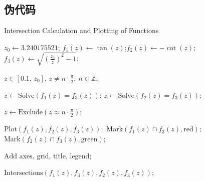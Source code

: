 \subsection{伪代码}

\begin{algorithm}[H]
    \caption{Intersection Calculation and Plotting of Functions}
    \label{alg:intersection_calculation}

    $z_0 \gets 3.240175521$;
    $f_1(z) \gets \tan(z)$;\quad $f_2(z) \gets -\cot(z)$;\quad $f_3(z) \gets \sqrt{\left( \frac{z_0}{z} \right)^2 - 1}$;

    $z \in [0.1,\, z_0]$, $z \neq n \cdot \frac{\pi}{2},\ n \in \mathbb{Z}$;

    $z \gets \text{Solve}(f_1(z) = f_3(z))$;
    $z \gets \text{Solve}(f_2(z) = f_3(z))$;

    $z \gets \text{Exclude}(z \approx n \cdot \frac{\pi}{2})$;

    $\text{Plot}(f_1(z), f_2(z), f_3(z));$
    $\text{Mark}(f_1(z) \cap f_3(z), \text{red});$
    $\text{Mark}(f_2(z) \cap f_3(z), \text{green});$

    $\text{Add axes, grid, title, legend};$

    \Return $\text{Intersections}(f_1(z), f_3(z), f_2(z), f_3(z));$
\end{algorithm}

